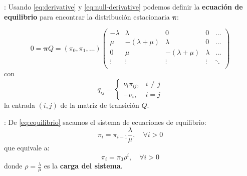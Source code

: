 \documentclass[xcolor={x11names}]{beamer}
\begin{document}
\begin{frame}{\secname: \subsecname}
    Usando \eqref{eq:derivative}
    y \eqref{eq:null-derivative} podemos
    definir la \textbf{ecuación de equilibrio}
    para encontrar la distribución estacionaria
    $\pmb{\pi}$:

    \begin{equation}
        0 = \pmb{\pi}Q = 
        (\pi_0, \pi_1, \ldots)
        \begin{pmatrix}
            -\lambda & \lambda & 0 & 0 & \ldots \\
            \mu & -(\lambda+\mu) & \lambda & 0 & \ldots \\
            0  & \mu & -(\lambda+\mu) & \lambda &  \ldots \\
            \vdots  & \vdots & \vdots & \vdots &  \ddots \\
        \end{pmatrix}
        \label{eq:equilibrio}
    \end{equation}
    con
    \begin{equation}
        q_{ij}=
        \begin{cases}
            \nu_i \pi_{i j}, & i\neq j\\
            -\nu_i, & i=j
        \end{cases}
    \end{equation}
    la entrada
    $(i,j)$ de la matriz de transición $Q$.

\end{frame}






\begin{frame}{\secname: \subsecname}
    De \eqref{eq:equilibrio} sacamos
    el sistema de ecuaciones de equilibrio:
    \begin{equation}
        \pi_i = \pi_{i-1} \frac{\lambda}{\mu},
        \quad \forall i>0
        \label{eq:sistema_equilibrio}
    \end{equation}
    que equivale a:
    \begin{equation}
        \pi_i = \pi_0 \rho^i, \quad \forall i>0
        \label{eq:sistema_equilibrio-potencia}
    \end{equation}
    donde $\rho=\tfrac{\lambda}{\mu}$
    es la \textbf{carga del sistema}.
\end{frame}
\end{document}
